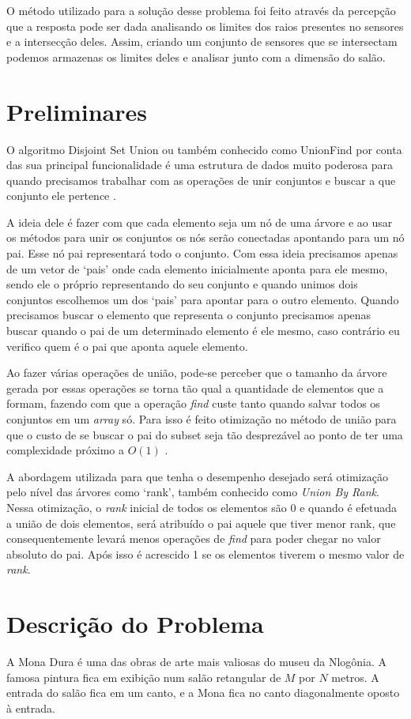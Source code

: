 \documentclass[12pt]{article}
\begin{document}
O método utilizado para a solução desse problema foi feito através da percepção que a resposta pode ser dada analisando os limites dos raios presentes no sensores e a intersecção deles. Assim, criando um conjunto de sensores que se intersectam podemos armazenas os limites deles e analisar junto com a dimensão do salão.
\section{Preliminares} \label{sec:preliminares}

O algoritmo Disjoint Set Union ou também conhecido como UnionFind por conta das sua principal funcionalidade é uma estrutura de dados muito poderosa para quando precisamos trabalhar com as operações de unir conjuntos e buscar a que conjunto ele pertence \cite{emaxx:19}.

A ideia dele é fazer com que cada elemento seja um nó de uma árvore e ao usar os métodos para unir os conjuntos os nós serão conectadas apontando para um nó pai. Esse nó pai representará todo o conjunto. Com essa ideia precisamos apenas de um vetor de `pais' onde cada elemento inicialmente aponta para ele mesmo, sendo ele o próprio representando do seu conjunto e quando unimos dois conjuntos escolhemos um dos `pais' para apontar para o outro elemento. Quando precisamos buscar o elemento que representa o conjunto precisamos apenas buscar quando o pai de um determinado elemento é ele mesmo,  caso contrário eu verifico quem é o pai que aponta aquele elemento.

Ao fazer várias operações de união, pode-se perceber que o tamanho da árvore gerada por essas operações se torna tão qual a quantidade de elementos que a formam, fazendo com que a operação \textit{find} custe tanto quando salvar todos os conjuntos em um \textit{array} só. Para isso é feito otimização no método de união para que o custo de se buscar o pai do subset seja tão desprezável ao ponto de ter uma complexidade próximo a $O(1)$ \cite{emaxx:19}.

A abordagem utilizada para que tenha o desempenho desejado será otimização pelo nível das árvores como `rank', também conhecido como \textit{Union By Rank}. Nessa otimização, o \textit{rank} inicial de todos os elementos são $0$ e quando é efetuada a união de dois elementos, será atribuído o pai aquele que tiver menor rank, que consequentemente levará menos operações de \textit{find} para poder chegar no valor absoluto do pai. Após isso é acrescido 1 se os elementos tiverem o mesmo valor de \textit{rank}.   
\section{Descrição do Problema}
A Mona Dura é uma das obras de arte mais valiosas do museu da Nlogônia. A famosa pintura fica em exibição num salão retangular de $M$ por $N$ metros. A entrada do salão fica em um canto, e a Mona fica no canto diagonalmente oposto à entrada.
\end{document}

